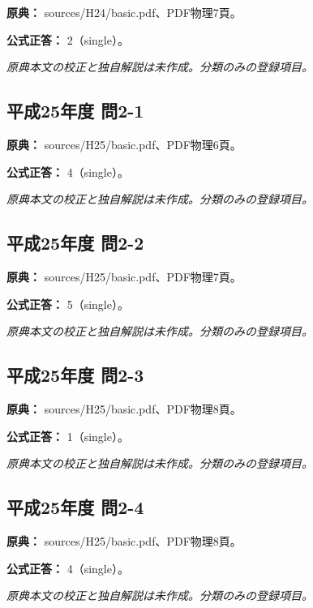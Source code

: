 \noindent\textbf{原典：} sources/H24/basic.pdf、PDF物理7頁。

\textbf{公式正答：} 2（single）。

\par\textit{原典本文の校正と独自解説は未作成。分類のみの登録項目。}

\subsection{平成25年度 問2-1}
\label{q:h25-reg-basic-2-1}

\noindent\textbf{原典：} sources/H25/basic.pdf、PDF物理6頁。

\textbf{公式正答：} 4（single）。

\par\textit{原典本文の校正と独自解説は未作成。分類のみの登録項目。}

\subsection{平成25年度 問2-2}
\label{q:h25-reg-basic-2-2}

\noindent\textbf{原典：} sources/H25/basic.pdf、PDF物理7頁。

\textbf{公式正答：} 5（single）。

\par\textit{原典本文の校正と独自解説は未作成。分類のみの登録項目。}

\subsection{平成25年度 問2-3}
\label{q:h25-reg-basic-2-3}

\noindent\textbf{原典：} sources/H25/basic.pdf、PDF物理8頁。

\textbf{公式正答：} 1（single）。

\par\textit{原典本文の校正と独自解説は未作成。分類のみの登録項目。}

\subsection{平成25年度 問2-4}
\label{q:h25-reg-basic-2-4}

\noindent\textbf{原典：} sources/H25/basic.pdf、PDF物理8頁。

\textbf{公式正答：} 4（single）。

\par\textit{原典本文の校正と独自解説は未作成。分類のみの登録項目。}

